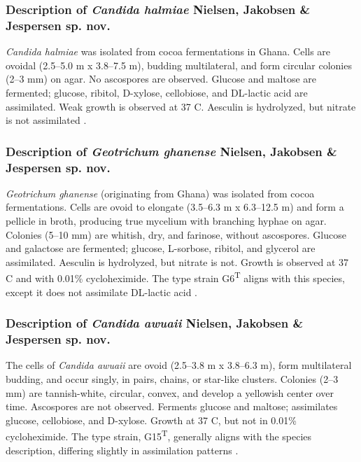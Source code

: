 \subsubsection*{Description of \textit{Candida halmiae} Nielsen, Jakobsen \& Jespersen sp. nov.}
\textit{Candida halmiae} was isolated from cocoa fermentations in Ghana. Cells are ovoidal (2.5–5.0 \textmu m x 3.8–7.5 \textmu m), budding multilateral, and form circular colonies (2–3 mm) on agar. No ascospores are observed. Glucose and maltose are fermented; glucose, ribitol, D-xylose, cellobiose, and DL-lactic acid are assimilated. Weak growth is observed at 37 \textdegree C. Aesculin is hydrolyzed, but nitrate is not assimilated  \cite*{L4-NewYeast}.
\subsubsection*{Description of \textit{Geotrichum ghanense} Nielsen, Jakobsen \& Jespersen sp. nov.}
\textit{Geotrichum ghanense} (originating from Ghana) was isolated from cocoa fermentations. Cells are ovoid to elongate (3.5–6.3 \textmu m x 6.3–12.5 \textmu m) and form a pellicle in broth, producing true mycelium with branching hyphae on agar. Colonies (5–10 mm) are whitish, dry, and farinose, without ascospores. Glucose and galactose are fermented; glucose, L-sorbose, ribitol, and glycerol are assimilated. Aesculin is hydrolyzed, but nitrate is not. Growth is observed at 37 \textdegree C and with 0.01\% cycloheximide. The type strain G6\textsuperscript{T} aligns with this species, except it does not assimilate DL-lactic acid \cite*{L4-NewYeast}.
\subsubsection*{Description of \textit{Candida awuaii} Nielsen, Jakobsen \& Jespersen sp. nov.}
The cells of \textit{Candida awuaii} are ovoid (2.5–3.8 \textmu m x 3.8–6.3 \textmu m), form multilateral budding, and occur singly, in pairs, chains, or star-like clusters. Colonies (2–3 mm) are tannish-white, circular, convex, and develop a yellowish center over time. Ascospores are not observed. Ferments glucose and maltose; assimilates glucose, cellobiose, and D-xylose. Growth at 37 \textdegree C, but not in 0.01\% cycloheximide. The type strain, G15\textsuperscript{T}, generally aligns with the species description, differing slightly in assimilation patterns \cite*{L4-NewYeast}.

